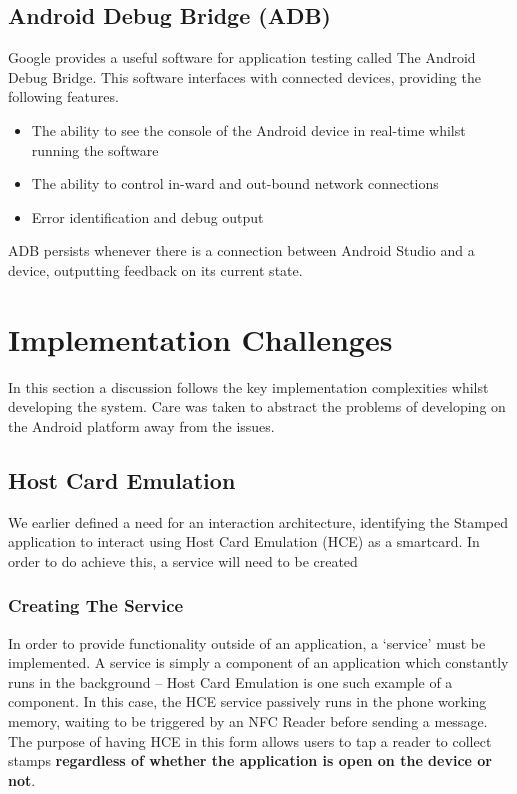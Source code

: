 \newpage
\subsection{Android Debug Bridge (ADB)}
Google provides a useful software for application testing called The Android Debug Bridge. This software interfaces with connected devices, providing the following features.
\begin{itemize}
 \item The ability to see the console of the Android device in real-time whilst running the software
  \item The ability to control in-ward and out-bound network connections
   \item Error identification and debug output
\end{itemize} 

ADB persists whenever there is a connection between Android Studio and a device, outputting feedback on its current state.

\section{Implementation Challenges}
In this section a discussion follows the key implementation complexities whilst developing the system. Care was taken to abstract the problems of developing on the Android platform away from the issues.
\subsection{Host Card Emulation}
We earlier defined a need for an interaction architecture, identifying the Stamped application to interact using Host Card Emulation (HCE) as a smartcard. In order to do achieve this, a service will need to be created 


\subsubsection{Creating The Service}
In order to provide functionality outside of an application, a `service' must be implemented. A service is simply a component of an application which constantly runs in the background -- Host Card Emulation is one such example of a component. In this case, the HCE service passively runs in the phone working memory, waiting to be triggered by an NFC Reader before sending a message. The purpose of having HCE in this form allows users to tap a reader to collect stamps \textbf{regardless of whether the application is open on the device or not}.


